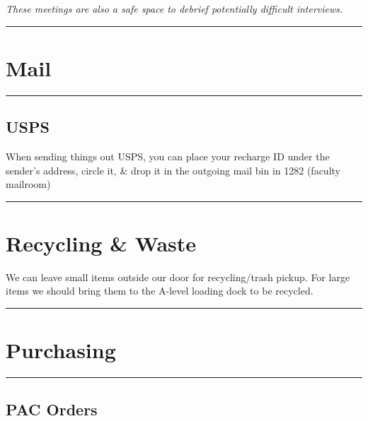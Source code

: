 \documentclass[]{book}
\begin{document}
\emph{These meetings are also a safe space to debrief potentially difficult interviews.}

\begin{center}\rule{0.5\linewidth}{0.5pt}\end{center}

\hypertarget{mail}{%
\section{Mail}\label{mail}}

\begin{center}\rule{0.5\linewidth}{0.5pt}\end{center}

\hypertarget{usps}{%
\subsection{USPS}\label{usps}}

When sending things out USPS, you can place your recharge ID under the sender's address, circle it, \& drop it in the outgoing mail bin in 1282 (faculty mailroom)

\begin{center}\rule{0.5\linewidth}{0.5pt}\end{center}

\hypertarget{recycling-waste}{%
\section{Recycling \& Waste}\label{recycling-waste}}

We can leave small items outside our door for recycling/trash pickup. For large items we should bring them to the A-level loading dock to be recycled.

\begin{center}\rule{0.5\linewidth}{0.5pt}\end{center}

\hypertarget{purchasing}{%
\section{Purchasing}\label{purchasing}}

\begin{center}\rule{0.5\linewidth}{0.5pt}\end{center}

\hypertarget{pac-orders}{%
\subsection{PAC Orders}\label{pac-orders}}
\end{document}

